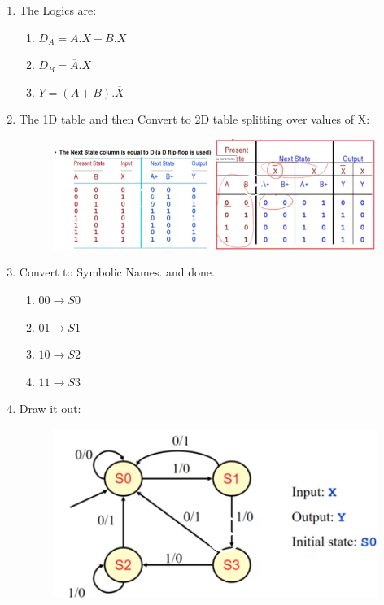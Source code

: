 \documentclass[11pt, a4paper]{article}
\begin{document}
\begin{enumerate}
    \item The Logics are:
    \begin{enumerate}
        \item $D_{A} = A.X + B.X$
        \item $D_{B} = \overline{A}.X$
        \item $Y = (A+B).\overline{X}$
    \end{enumerate}
    \item The 1D table and then Convert to 2D table splitting over values of X:
    \begin{figure}[H]
        \includegraphics[width = 0.49\textwidth]{Pictures/FSM Ex3.2.png}
        \includegraphics[width = 0.49\textwidth]{Pictures/FSM Ex3.3.png}
    \end{figure}
    \item Convert to Symbolic Names. and done.
    \begin{enumerate}
        \item $00 \to S0$
        \item $01 \to S1$
        \item $10 \to S2$
        \item $11 \to S3$
    \end{enumerate}
    \item Draw it out:
    \begin{figure}[H]
        \centering
        \includegraphics[width = \textwidth]{Pictures/FSM Ex3.4.png}

\end{figure}
\end{enumerate}
\end{document}
